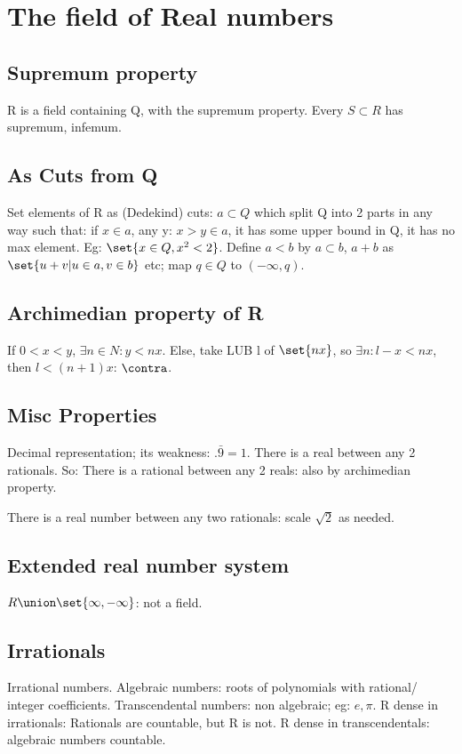 \documentclass[oneside, article]{memoir}
\begin{document}
\section{The field of Real numbers}
\subsection{Supremum property}
R is a field containing Q, with the supremum property. Every $S \subset R$ has supremum, infemum.

\subsection{As Cuts from Q}
Set elements of R as (Dedekind) cuts: $a \subset Q$ which split Q into 2 parts in any way such that: if $x \in a$, any y: $x > y \in a$, it has some upper bound in Q, it has no max element. Eg: $\set{x \in Q, x^{2}< 2}$. Define $a<b$ by $a \subset b$, $a + b$ as $\set{u + v| u \in a, v \in b}$ etc; map $q \in Q$ to $(-\infty, q)$.

\subsection{Archimedian property of R}
If $0<x<y$, $\exists n \in N : y<nx$. Else, take LUB l of $\set{nx}$, so $\exists n: l-x<nx$, then $l<(n+1)x$: $\contra$.

\subsection{Misc Properties}
Decimal representation; its weakness: $.\bar{9} = 1$. There is a real between any 2 rationals. So: There is a rational between any 2 reals: also by archimedian property.

There is a real number between any two rationals: scale $\sqrt{2}$ as needed.

\subsection{Extended real number system}
$R \union \set{\infty, -\infty}$: not a field.

\subsection{Irrationals}
Irrational numbers. Algebraic numbers: roots of polynomials with rational/ integer coefficients. Transcendental numbers: non algebraic; eg: $e, \pi$. R dense in irrationals: Rationals are countable, but R is not. R dense in transcendentals: algebraic numbers countable.
\end{document}
